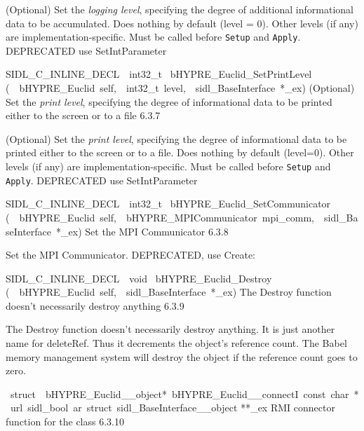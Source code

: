 \documentclass{article}
\begin{document}
\begin{cxxentry}
\begin{cxxentry}
\begin{cxxfunction}
\begin{cxxdoc}
(Optional) Set the {\it logging level}, specifying the degree
of additional informational data to be accumulated.  Does
nothing by default (level = 0).  Other levels (if any) are
implementation-specific.  Must be called before {\tt Setup}
and {\tt Apply}.
DEPRECATED   use SetIntParameter
\end{cxxdoc}
\end{cxxfunction}
\begin{cxxfunction}
{SIDL\_C\_INLINE\_DECL\ \ int32\_t\ }
        {bHYPRE\_Euclid\_SetPrintLevel}
        {(\ \ bHYPRE\_Euclid\ self,\ \ int32\_t\ level,\ \ sidl\_BaseInterface\ *\_ex)}
        {
(Optional) Set the {\it print level}, specifying the degree
of informational data to be printed either to the screen or
to a file}
        {6.3.7}
\begin{cxxdoc}

(Optional) Set the {\it print level}, specifying the degree
of informational data to be printed either to the screen or
to a file.  Does nothing by default (level=0).  Other levels
(if any) are implementation-specific.  Must be called before
{\tt Setup} and {\tt Apply}.
DEPRECATED   use SetIntParameter
\end{cxxdoc}
\end{cxxfunction}
\begin{cxxfunction}
{SIDL\_C\_INLINE\_DECL\ \ int32\_t\ }
        {bHYPRE\_Euclid\_SetCommunicator}
        {(\ \ bHYPRE\_Euclid\ self,\ \ bHYPRE\_MPICommunicator\ mpi\_comm,\ \ sidl\_BaseInterface\ *\_ex)}
        {
Set the MPI Communicator}
        {6.3.8}
\begin{cxxdoc}

Set the MPI Communicator.
DEPRECATED, use Create:
\end{cxxdoc}
\end{cxxfunction}
\begin{cxxfunction}
{SIDL\_C\_INLINE\_DECL\ \ void\ }
        {bHYPRE\_Euclid\_Destroy}
        {(\ \ bHYPRE\_Euclid\ self,\ \ sidl\_BaseInterface\ *\_ex)}
        {
The Destroy function doesn't necessarily destroy anything}
        {6.3.9}
\begin{cxxdoc}

The Destroy function doesn't necessarily destroy anything.
It is just another name for deleteRef.  Thus it decrements the
object's reference count.  The Babel memory management system will
destroy the object if the reference count goes to zero.
\end{cxxdoc}
\end{cxxfunction}
\begin{cxxvariable}
{\ struct\ \ bHYPRE\_Euclid\_\_object*\ bHYPRE\_Euclid\_\_connectI\ const\ char\ *\ url\ sidl\_bool\ ar\ struct\ sidl\_BaseInterface\_\_object}
        {**\_ex}
        {}
        {
RMI connector function for the class}
        {6.3.10}
\begin{cxxdoc}


\end{cxxdoc}
\end{cxxvariable}
\end{cxxentry}
\end{cxxentry}
\end{document}
